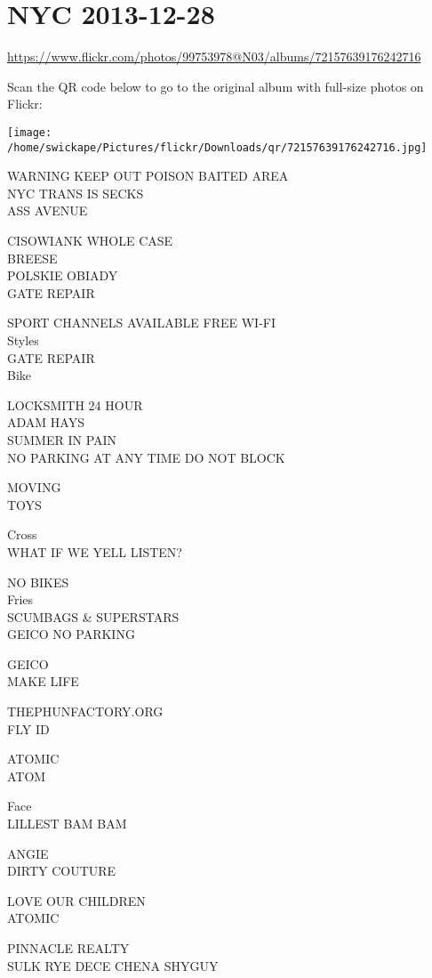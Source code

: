 \documentclass[10pt,letterpaper]{article}
\begin{document}
\section*{NYC 2013-12-28}

\url{https://www.flickr.com/photos/99753978@N03/albums/72157639176242716}

Scan the QR code below to go to the original album with full-size photos on Flickr:

\texttt{[image: /home/swickape/Pictures/flickr/Downloads/qr/72157639176242716.jpg]}
\pagebreak

WARNING KEEP OUT POISON BAITED AREA\\
NYC TRANS IS SECKS\\
ASS AVENUE

CISOWIANK WHOLE CASE\\
BREESE\\
POLSKIE OBIADY\\
GATE REPAIR

SPORT CHANNELS AVAILABLE FREE WI{-}FI\\
Styles\\
GATE REPAIR\\
Bike

LOCKSMITH 24 HOUR\\
ADAM HAYS\\
SUMMER IN PAIN\\
NO PARKING AT ANY TIME DO NOT BLOCK

MOVING\\
TOYS

Cross\\
WHAT IF WE YELL LISTEN?

NO BIKES\\
Fries\\
SCUMBAGS \& SUPERSTARS\\
GEICO NO PARKING

GEICO\\
MAKE LIFE

THEPHUNFACTORY.ORG\\
FLY ID

ATOMIC\\
ATOM

Face\\
LILLEST BAM BAM

ANGIE\\
DIRTY COUTURE

LOVE OUR CHILDREN\\
ATOMIC

PINNACLE REALTY\\
SULK RYE DECE CHENA SHYGUY
\end{document}
